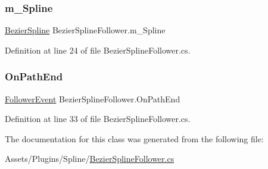 \subsubsection{\texorpdfstring{m\+\_\+\+Spline}{m\_Spline}}
{\footnotesize\ttfamily \mbox{\hyperlink{class_bezier_spline}{Bezier\+Spline}} Bezier\+Spline\+Follower.\+m\+\_\+\+Spline}



Definition at line 24 of file Bezier\+Spline\+Follower.\+cs.

\mbox{\label{class_bezier_spline_follower_af95926bc84f097c69a5aeaff540e0197}} 
\subsubsection{\texorpdfstring{On\+Path\+End}{OnPathEnd}}
{\footnotesize\ttfamily \mbox{\hyperlink{class_bezier_spline_follower_1_1_follower_event}{Follower\+Event}} Bezier\+Spline\+Follower.\+On\+Path\+End}



Definition at line 33 of file Bezier\+Spline\+Follower.\+cs.



The documentation for this class was generated from the following file\+:\begin{DoxyCompactItemize}
\item 
Assets/\+Plugins/\+Spline/\mbox{\hyperlink{_bezier_spline_follower_8cs}{Bezier\+Spline\+Follower.\+cs}}\end{DoxyCompactItemize}
